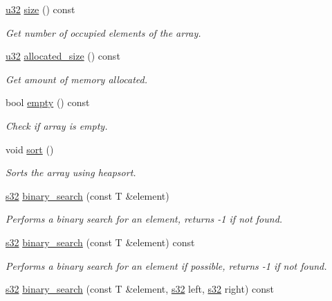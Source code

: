 \begin{DoxyCompactItemize}
\hyperlink{namespaceirr_a0416a53257075833e7002efd0a18e804}{u32} \hyperlink{classirr_1_1core_1_1array_ab10777d1bb278c29e159ec59b5dc9378}{size} () const
\begin{DoxyCompactList}\small\item\em Get number of occupied elements of the array. \end{DoxyCompactList}\item 
\hyperlink{namespaceirr_a0416a53257075833e7002efd0a18e804}{u32} \hyperlink{classirr_1_1core_1_1array_a21e5b20b7a56ba174b19b6c36c78a14b}{allocated\+\_\+size} () const
\begin{DoxyCompactList}\small\item\em Get amount of memory allocated. \end{DoxyCompactList}\item 
bool \hyperlink{classirr_1_1core_1_1array_a956ee1019455016e21e218b61f6371ca}{empty} () const
\begin{DoxyCompactList}\small\item\em Check if array is empty. \end{DoxyCompactList}\item 
void \hyperlink{classirr_1_1core_1_1array_a870e52dd57dd67a9d59e5ca5f82bca94}{sort} ()
\begin{DoxyCompactList}\small\item\em Sorts the array using heapsort. \end{DoxyCompactList}\item 
\hyperlink{namespaceirr_ac66849b7a6ed16e30ebede579f9b47c6}{s32} \hyperlink{classirr_1_1core_1_1array_a35412f669b983eaaf3792b82966db24a}{binary\+\_\+search} (const T \&element)
\begin{DoxyCompactList}\small\item\em Performs a binary search for an element, returns -\/1 if not found. \end{DoxyCompactList}\item 
\hyperlink{namespaceirr_ac66849b7a6ed16e30ebede579f9b47c6}{s32} \hyperlink{classirr_1_1core_1_1array_aec40f807c683671067d52e83d7b72a82}{binary\+\_\+search} (const T \&element) const
\begin{DoxyCompactList}\small\item\em Performs a binary search for an element if possible, returns -\/1 if not found. \end{DoxyCompactList}\item 
\hyperlink{namespaceirr_ac66849b7a6ed16e30ebede579f9b47c6}{s32} \hyperlink{classirr_1_1core_1_1array_a9f3d6ee26c52d2e231446e4069a765a3}{binary\+\_\+search} (const T \&element, \hyperlink{namespaceirr_ac66849b7a6ed16e30ebede579f9b47c6}{s32} left, \hyperlink{namespaceirr_ac66849b7a6ed16e30ebede579f9b47c6}{s32} right) const

\end{DoxyCompactItemize}
